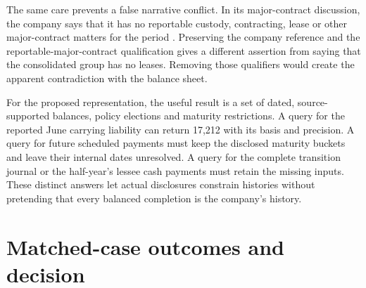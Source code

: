 The same care prevents a false narrative conflict. In its major-contract
discussion, the company says that it has no reportable custody, contracting,
lease or other major-contract matters for the period
\citep[p.\ 86]{pingan2019asbe}. Preserving the company reference and
the reportable-major-contract qualification gives a different assertion
from saying that the consolidated group has no leases. Removing those
qualifiers would create the apparent contradiction with the balance sheet.

For the proposed representation, the useful result is a set of dated,
source-supported balances, policy elections and maturity restrictions.
A query for the reported June carrying liability can return 17,212 with
its basis and precision. A query for future scheduled payments must keep
the disclosed maturity buckets and leave their internal dates unresolved.
A query for the complete transition journal or the half-year's lessee cash
payments must retain the missing inputs. These distinct answers let actual
disclosures constrain histories without pretending that every balanced
completion is the company's history.

\clearpage

\hypertarget{matched-case-outcomes-and-decision}{%
\section{Matched-case outcomes and decision}\label{method-standards-methods-matched-case-outcomes-and-decision}}

